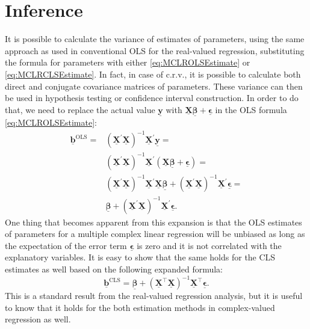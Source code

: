 \documentclass[
]{book}
\begin{document}
\hypertarget{inference}{%
\section{Inference}\label{inference}}

It is possible to calculate the variance of estimates of parameters, using the same approach as used in conventional OLS for the real-valued regression, substituting the formula for parameters with either \eqref{eq:MCLROLSEstimate} or \eqref{eq:MCLRCLSEstimate}. In fact, in case of c.r.v., it is possible to calculate both direct and conjugate covariance matrices of parameters. These variance can then be used in hypothesis testing or confidence interval construction. In order to do that, we need to replace the actual value \(\underline{\mathbf{y}}\) with \(\underline{\mathbf{X}} \underline{\boldsymbol{\beta}} + \underline{\boldsymbol{\epsilon}}\) in the OLS formula \eqref{eq:MCLROLSEstimate}:
\begin{equation}
    \begin{aligned}
    \underline{\boldsymbol{b}}^{\text{OLS}} =
        & \left( \underline{\mathbf{X}}^\prime \underline{\mathbf{X}} \right)^{-1} \underline{\mathbf{X}}^\prime \underline{\mathbf{y}} = \\
        & \left( \underline{\mathbf{X}}^\prime \underline{\mathbf{X}} \right)^{-1} \underline{\mathbf{X}}^\prime (\underline{\mathbf{X}} \underline{\boldsymbol{\beta}} + \underline{\boldsymbol{\epsilon}}) = \\
        & \left( \underline{\mathbf{X}}^\prime \underline{\mathbf{X}} \right)^{-1} \underline{\mathbf{X}}^\prime \underline{\mathbf{X}} \underline{\boldsymbol{\beta}} + \left( \underline{\mathbf{X}}^\prime \underline{\mathbf{X}} \right)^{-1} \underline{\mathbf{X}}^\prime \underline{\boldsymbol{\epsilon}} = \\
        & \underline{\boldsymbol{\beta}} + \left( \underline{\mathbf{X}}^\prime \underline{\mathbf{X}} \right)^{-1} \underline{\mathbf{X}}^\prime \underline{\boldsymbol{\epsilon}} .
    \end{aligned}
    \label{eq:MCLROLSExpansion}
\end{equation}
One thing that becomes apparent from this expansion is that the OLS estimates of parameters for a multiple complex linear regression will be unbiased as long as the expectation of the error term \(\underline{\boldsymbol{\epsilon}}\) is zero and it is not correlated with the explanatory variables. It is easy to show that the same holds for the CLS estimates as well based on the following expanded formula:
\begin{equation}
    \underline{\boldsymbol{b}}^{\text{CLS}} = \underline{\boldsymbol{\beta}} + \left( \underline{\mathbf{X}}^\top \underline{\mathbf{X}} \right)^{-1} \underline{\mathbf{X}}^\top \underline{\boldsymbol{\epsilon}} .
    \label{eq:MCLRCLSExpansion}
\end{equation}
This is a standard result from the real-valued regression analysis, but it is useful to know that it holds for the both estimation methods in complex-valued regression as well.
\end{document}
